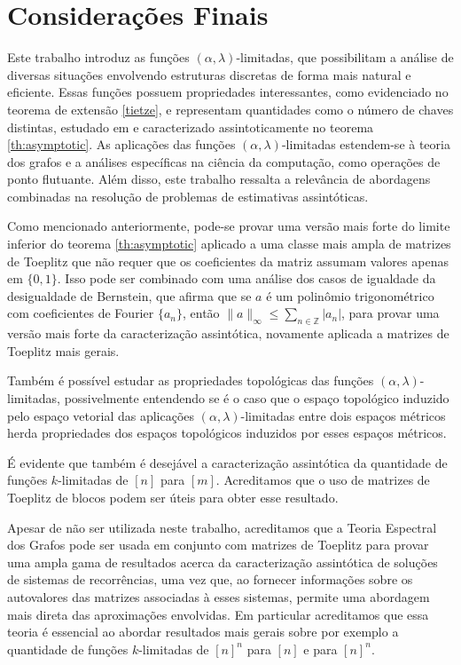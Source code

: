 \section*{Considerações Finais}
\vspace{1cm}

Este trabalho introduz as funções $(\alpha, \lambda)$-limitadas, que possibilitam a análise de diversas situações envolvendo estruturas discretas de forma mais natural e eficiente. Essas funções possuem propriedades interessantes, como evidenciado no teorema de extensão \ref{tietze}, e representam quantidades como o número de chaves distintas, estudado em \cite{coulson} e caracterizado assintoticamente no teorema \ref{th:asymptotic}. As aplicações das funções $(\alpha, \lambda)$-limitadas estendem-se à teoria dos grafos e a análises específicas na ciência da computação, como operações de ponto flutuante. Além disso, este trabalho ressalta a relevância de abordagens combinadas na resolução de problemas de estimativas assintóticas.

Como mencionado anteriormente, pode-se provar uma versão mais forte do limite inferior do teorema \ref{th:asymptotic} aplicado a uma classe mais ampla de matrizes de Toeplitz que não requer que os coeficientes da matriz assumam valores apenas em $\{0, 1\}$. Isso pode ser combinado com uma análise dos casos de igualdade da desigualdade de Bernstein, que afirma que se $a$ é um polinômio trigonométrico com coeficientes de Fourier $\{a_n\}$, então $\|a\|_\infty \le \sum_{n \in \mathbb{Z}} \lvert a_n\rvert$, para provar uma versão mais forte da caracterização assintótica, novamente aplicada a matrizes de Toeplitz mais gerais.

Também é possível estudar as propriedades topológicas das funções $(\alpha, \lambda)$-limitadas, possivelmente entendendo se é o caso que o espaço topológico induzido pelo espaço vetorial das aplicações $(\alpha, \lambda)$-limitadas entre dois espaços métricos herda propriedades dos espaços topológicos induzidos por esses espaços métricos.

É evidente que também é desejável a caracterização assintótica da quantidade de funções $k$-limitadas de $[n]$ para $[m]$. Acreditamos que o uso de matrizes de Toeplitz de blocos podem ser úteis para obter esse resultado.

Apesar de não ser utilizada neste trabalho, acreditamos que a Teoria Espectral dos Grafos pode ser usada em conjunto com matrizes de Toeplitz para provar uma ampla gama de resultados acerca da caracterização assintótica de soluções de sistemas de recorrências, uma vez que, ao fornecer informações sobre os autovalores das matrizes associadas à esses sistemas, permite uma abordagem mais direta das aproximações envolvidas. Em particular acreditamos que essa teoria é essencial ao abordar resultados mais gerais sobre por exemplo a quantidade de funções $k$-limitadas de $[n]^n$ para $[n]$ e para $[n]^n$.
